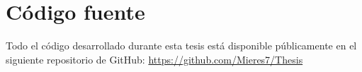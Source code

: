 \chapter{Código fuente}
\label{anexo:repositorio}

Todo el código desarrollado durante esta tesis está disponible públicamente en el siguiente repositorio de GitHub: \url{https://github.com/Mieres7/Thesis}